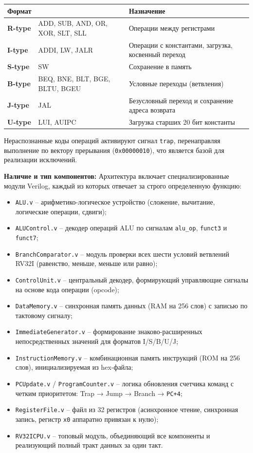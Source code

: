 \begin{center}
\begin{tabular}{|l|>{\ttfamily}p{5cm}|p{8cm}|}
\hline
\textbf{Формат} & \multicolumn{1}{c|}{\textbf{Примеры команд}} & \textbf{Назначение} \\
\hline
\textbf{R-type} & ADD, SUB, AND, OR, XOR, SLT, SLL & Операции между регистрами \\
\hline
\textbf{I-type} & ADDI, LW, JALR & Операции с константами, загрузка, косвенный переход \\
\hline
\textbf{S-type} & SW & Сохранение в память \\
\hline
\textbf{B-type} & BEQ, BNE, BLT, BGE, BLTU, BGEU & Условные переходы (ветвления) \\
\hline
\textbf{J-type} & JAL & Безусловный переход и сохранение адреса возврата \\
\hline
\textbf{U-type} & LUI, AUIPC & Загрузка старших 20 бит константы \\
\hline
\end{tabular}
\end{center}

Нераспознанные коды операций активируют сигнал \texttt{trap}, перенаправляя выполнение по вектору прерывания (\texttt{0x00000010}), что является базой для реализации исключений.

\textbf{Наличие и тип компонентов:}
Архитектура включает специализированные модули Verilog, каждый из которых отвечает за строго определенную функцию:

\begin{itemize}
    \item \texttt{ALU.v} – арифметико-логическое устройство (сложение, вычитание, логические операции, сдвиги);
    \item \texttt{ALUControl.v} – декодер операций ALU по сигналам \texttt{alu\_op}, \texttt{funct3} и \texttt{funct7};
    \item \texttt{BranchComparator.v} – модуль проверки всех шести условий ветвлений RV32I (равенство, меньше, меньше или равно);
    \item \texttt{ControlUnit.v} – центральный декодер, формирующий управляющие сигналы на основе кода операции (opcode);
    \item \texttt{DataMemory.v} – синхронная память данных (RAM на 256 слов) с записью по тактовому сигналу;
    \item \texttt{ImmediateGenerator.v} – формирование знаково-расширенных непосредственных значений для форматов I/S/B/U/J;
    \item \texttt{InstructionMemory.v} – комбинационная память инструкций (ROM на 256 слов), инициализируемая из hex-файла;
    \item \texttt{PCUpdate.v} / \texttt{ProgramCounter.v} – логика обновления счетчика команд с четким приоритетом: Trap → Jump → Branch → \texttt{PC+4};
    \item \texttt{RegisterFile.v} – файл из 32 регистров (асинхронное чтение, синхронная запись, регистр \texttt{x0} аппаратно привязан к нулю);
    \item \texttt{RV32ICPU.v} – топовый модуль, объединяющий все компоненты и реализующий полный тракт данных за один такт.
\end{itemize}


